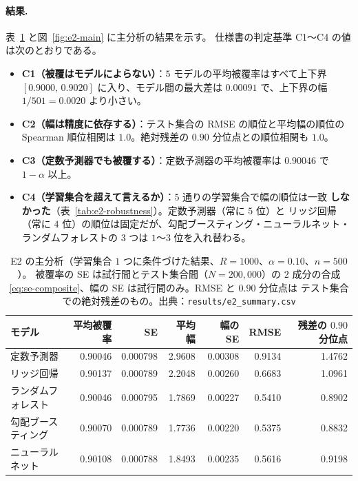 \documentclass[a4paper,11pt]{jsarticle}
\theoremstyle{definition}
\theoremstyle{plain}
\theoremstyle{remark}
\begin{document}
\paragraph{結果.}
表~\ref{tab:e2-summary} と図~\ref{fig:e2-main} に主分析の結果を示す。
仕様書の判定基準 C1〜C4 の値は次のとおりである。
\begin{itemize}
  \item \textbf{C1（被覆はモデルによらない）}：$5$ モデルの平均被覆率はすべて上下界
    $[0.9000,\,0.9020]$ に入り、モデル間の最大差は $0.00091$ で、上下界の幅 $1/501=0.0020$
    より小さい。
  \item \textbf{C2（幅は精度に依存する）}：テスト集合の RMSE の順位と平均幅の順位の
    Spearman 順位相関は $1.0$。絶対残差の $0.90$ 分位点との順位相関も $1.0$。
  \item \textbf{C3（定数予測器でも被覆する）}：定数予測器の平均被覆率は $0.90046$ で
    $1-\alpha$ 以上。
  \item \textbf{C4（学習集合を超えて言えるか）}：$5$ 通りの学習集合で幅の順位は一致
    \textbf{しなかった}（表~\ref{tab:e2-robustness}）。定数予測器（常に $5$ 位）と
    リッジ回帰（常に $4$ 位）の順位は固定だが、勾配ブースティング・ニューラルネット・
    ランダムフォレストの $3$ つは $1$〜$3$ 位を入れ替わる。
\end{itemize}

\begin{table}[htbp]
  \centering
  \caption{E2 の主分析（学習集合 $1$ つに条件づけた結果、$R=1000$、$\alpha=0.10$、$n=500$）。
    被覆率の SE は試行間とテスト集合間（$N=200{,}000$）の $2$ 成分の合成
    \eqref{eq:se-composite}、幅の SE は試行間のみ。RMSE と $0.90$ 分位点は
    テスト集合での絶対残差のもの。出典：\texttt{results/e2\_summary.csv}}
  \label{tab:e2-summary}
  \small
  \begin{tabular}{lrrrrrr}
    \toprule
    モデル & 平均被覆率 & SE & 平均幅 & 幅の SE & RMSE & 残差の $0.90$ 分位点 \\
    \midrule
    定数予測器 & 0.90046 & 0.000798 & 2.9608 & 0.00308 & 0.9134 & 1.4762 \\
    リッジ回帰 & 0.90137 & 0.000789 & 2.2048 & 0.00260 & 0.6683 & 1.0961 \\
    ランダムフォレスト & 0.90046 & 0.000795 & 1.7869 & 0.00227 & 0.5410 & 0.8902 \\
    勾配ブースティング & 0.90070 & 0.000789 & 1.7736 & 0.00220 & 0.5375 & 0.8832 \\
    ニューラルネット & 0.90108 & 0.000788 & 1.8493 & 0.00235 & 0.5616 & 0.9198 \\
    \bottomrule
  \end{tabular}
\end{table}
\end{document}

